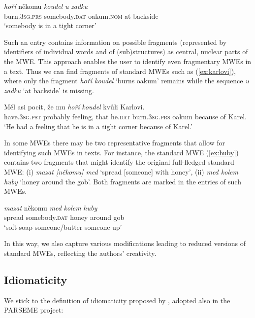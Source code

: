 \documentclass[output=paper,colorlinks,citecolor=brown]{langscibook}
\begin{document}
\ea \label{ex:zadku}
\gll \emph{hoří} někomu \emph{koudel} \emph{u} \emph{zadku}\\
     burn.\textsc{3sg.prs} somebody.\textsc{dat} oakum.\textsc{nom} at backside\\
\glt `somebody is in a tight corner'
\z

\noindent
Such an entry contains information on possible
fragments (represented by identifiers of individual words and of
(sub)structures) as central, nuclear parts of the MWE. This
approach enables the user to identify even fragmentary MWEs in a text. Thus we can find fragments of standard MWEs such as (\ref{ex:karlovi}), where only the fragment  \emph{hoří koudel} ‘burns oakum’ remains while the sequence \emph{u zadku} ‘at backside’ is missing.

\ea \label{ex:karlovi}
\gll Měl asi pocit, že mu \emph{hoří} \emph{koudel} kvůli Karlovi.\\
     have.\textsc{3sg.pst} probably
     feeling, that he.\textsc{dat}
     burn.\textsc{3sg.prs} oakum {because of} Karel.\\
\glt `He had a feeling that he is in a tight corner because
of Karel.'
\z

\begin{sloppypar}
\noindent
In some MWEs there may be two representative fragments that allow for identifying such MWEs in texts. For instance, the standard MWE (\ref{ex:huby}) contains two fragments that might identify the original full-fledged standard MWE: (i) \emph{mazat [někomu] med} ‘spread [someone] with honey’, (ii) \emph{med kolem huby} ‘honey around the gob’. Both fragments are marked in the entries of such MWEs.
\end{sloppypar}

\ea \label{ex:huby}
\gll \emph{mazat} někomu \emph{med} \emph{kolem} \emph{huby}\\
     spread somebody.\textsc{dat} honey around gob\\
\glt `soft-soap someone\slash butter someone up'
\z

\noindent
In this way, we also capture various modifications leading to reduced versions of standard MWEs, reflecting the authors' creativity.


\subsection{Idiomaticity}
\label{sec:idiom}

We stick to the definition of idiomaticity proposed by \citet{baldwin2010multiword}, adopted also in the PARSEME project:
\end{document}
